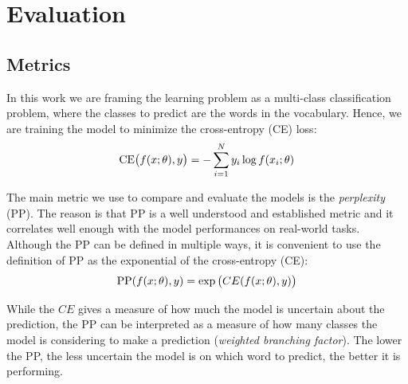 
\section{Evaluation}
\label{sec:5_eval}
\subsection{Metrics}
In this work we are framing the learning problem as a multi-class classification problem, where the classes to predict are the words in the vocabulary. Hence, we are training the model to minimize the cross-entropy (CE) loss:
\begin{equation}
    \text{CE} \parenth[\big]{f(x; \theta), y} = -\sum_{i=1}^{N} y_i \log{f(x_i; \theta)}
\end{equation}

The main metric we use to compare and evaluate the models is the \emph{perplexity} (PP). The reason is that PP is a well understood and established metric and it correlates well enough with the model performances on real-world tasks. Although the PP can be defined in multiple ways, it is convenient to use the definition of PP as the exponential of the cross-entropy (CE):
\begin{equation}
    \text{PP}(f(x; \theta), y) = \exp \parenth[\big]{CE(f(x; \theta), y)}
\end{equation}

While the $CE$ gives a measure of how much the model is uncertain about the prediction, the PP can be interpreted as a measure of how many classes the model is considering to make a prediction (\emph{weighted branching factor}). The lower the PP, the less uncertain the model is on which word to predict, the better it is performing.

